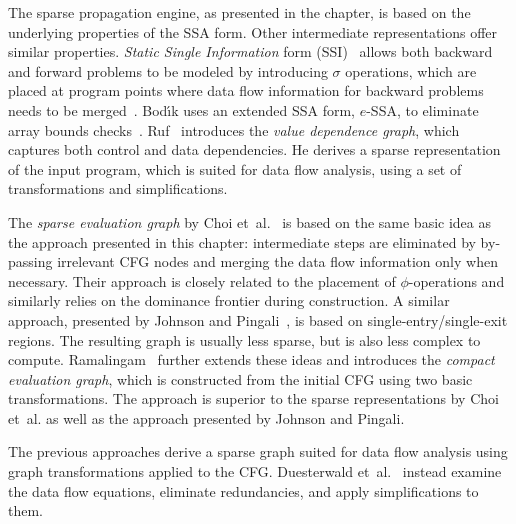 The sparse propagation engine, as presented in the chapter, is based on the
underlying properties of the SSA form. Other intermediate representations offer
similar properties. \emph{Static Single Information} form
(SSI)~\cite{novillo:bib:S05} allows both backward and forward problems to be
modeled by introducing $\sigma$ operations, which are placed at program points
where data flow information for backward problems needs to be
merged~\cite{novillo:bib:S04}. Bod\'{\i}k uses an extended SSA form, $e$-SSA,
to eliminate array bounds checks~\cite{novillo:bib:BGV00}.
Ruf~\cite{novillo:bib:R95} introduces the \emph{value dependence graph}, which
captures both control and data dependencies. He derives a sparse representation
of the input program, which is suited for data flow analysis, using a set of
transformations and simplifications.

The \emph{sparse evaluation graph} by Choi et~al.~\cite{novillo:bib:CCF91} is
based on the same basic idea as the approach presented in this chapter:
intermediate steps are eliminated by by-passing irrelevant CFG nodes and
merging the data flow information only when necessary. Their approach is closely
related to the placement of $\phi$-operations and similarly relies on the
dominance frontier during construction. A similar approach, presented by Johnson
and Pingali~\cite{novillo:bib:JO93}, is based on single-entry/single-exit
regions. The resulting graph is usually less sparse, but is also less complex to
compute. Ramalingam~\cite{novillo:bib:R02} further extends these ideas and
introduces the \emph{compact evaluation graph}, which is constructed from the
initial CFG using two basic transformations. The approach is superior to the
sparse representations by Choi et~al. as well as the approach presented by
Johnson and Pingali.

The previous approaches derive a sparse graph suited for data flow analysis
using graph transformations applied to the CFG.
Duesterwald et~al.~\cite{novillo:bib:DGS94} instead examine the data flow
equations, eliminate redundancies, and apply simplifications to them.

